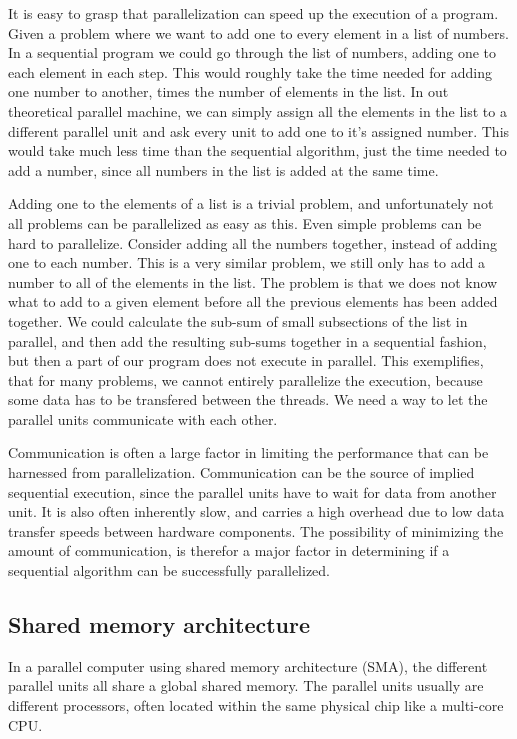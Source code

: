 It is easy to grasp that parallelization can speed up the execution of a program. Given a problem where we want to add one to every element in a list of numbers. In a sequential program we could go through the list of numbers, adding one to each element in each step. This would roughly take the time needed for adding one number to another, times the number of elements in the list. In out theoretical parallel machine, we can simply assign all the elements in the list to a different parallel unit and ask every unit to add one to it's assigned number. This would take much less time than the sequential algorithm, just the time needed to add a number, since all numbers in the list is added at the same time.

Adding one to the elements of a list is a trivial problem, and unfortunately not all problems can be parallelized as easy as this. Even simple problems can be hard to parallelize. Consider adding all the numbers together, instead of adding one to each number. This is a very similar problem, we still only has to add a number to all of the elements in the list. The problem is that we does not know what to add to a given element before all the previous elements has been added together. We could calculate the sub-sum of small subsections of the list in parallel, and then add the resulting sub-sums together in a sequential fashion, but then a part of our program does not execute in parallel. This exemplifies, that for many problems, we cannot entirely parallelize the execution, because some data has to be transfered between the threads. We need a way to let the parallel units communicate with each other.

Communication is often a large factor in limiting the performance that can be harnessed from parallelization. Communication can be the source of implied sequential execution, since the parallel units have to wait for data from another unit. It is also often inherently slow, and carries a high overhead due to low data transfer speeds between hardware components. The possibility of minimizing the amount of communication, is therefor a major factor in determining if a sequential algorithm can be successfully parallelized.

\subsection{Shared memory architecture} %
\label{sub:shared_memory_architecture}

In a parallel computer using shared memory architecture (SMA), the different parallel units all share a global shared memory. The parallel units usually are different processors, often located within the same physical chip like a multi-core CPU\@. 

